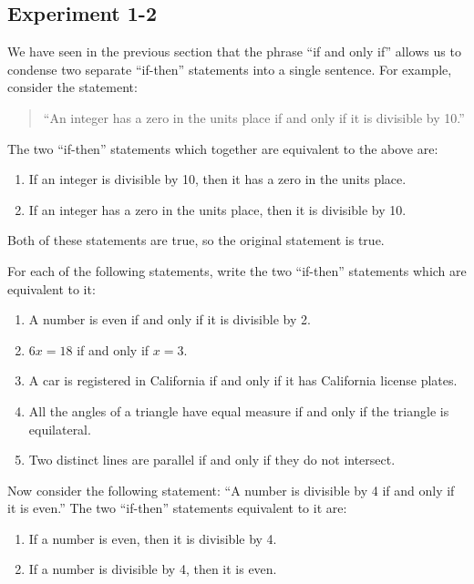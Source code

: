 \documentclass[12pt]{book} %
\begin{document}
\subsection*{Experiment 1-2}

We have seen in the previous section that the phrase ``if and only if'' allows us to condense two separate ``if-then'' statements into a single sentence. For example, consider the statement:

\begin{quote}
	``An integer has a zero in the units place if and only if it is divisible by 10.''
\end{quote}

The two ``if-then'' statements which together are equivalent to the above are:
\begin{enumerate}
	\item If an integer is divisible by 10, then it has a zero in the units place.
	\item If an integer has a zero in the units place, then it is divisible by 10.
\end{enumerate}

Both of these statements are true, so the original statement is true.

For each of the following statements, write the two ``if-then'' statements which are equivalent to it:
\begin{enumerate}
	\item[(a)] A number is even if and only if it is divisible by 2.
	\item[(b)] $6x=18$ if and only if $x=3$.
	\item[(c)] A car is registered in California if and only if it has California license plates.
	\item[(d)] All the angles of a triangle have equal measure if and only if the triangle is equilateral.
	\item[(e)] Two distinct lines are parallel if and only if they do not intersect.
\end{enumerate}

Now consider the following statement: ``A number is divisible by 4 if and only if it is even.'' The two ``if-then'' statements equivalent to it are:
\begin{enumerate}
	\item If a number is even, then it is divisible by 4.
	\item If a number is divisible by 4, then it is even.
\end{enumerate}
\end{document}
